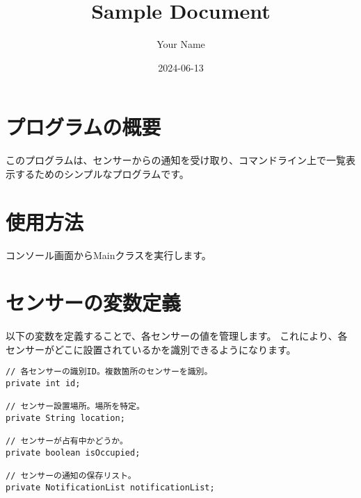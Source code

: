 \documentclass[11pt]{article}
\author{Your Name}
\date{2024-06-13}
\title{Sample Document}
\begin{document}
\maketitle

\section{プログラムの概要}
\label{sec:org3f72727}
このプログラムは、センサーからの通知を受け取り、コマンドライン上で一覧表示するためのシンプルなプログラムです。

\section{使用方法}
\label{sec:org97390fa}
コンソール画面からMainクラスを実行します。

\section{センサーの変数定義}
\label{sec:org344f41c}
以下の変数を定義することで、各センサーの値を管理します。
これにより、各センサーがどこに設置されているかを識別できるようになります。

\begin{lstlisting}
// 各センサーの識別ID。複数箇所のセンサーを識別。
private int id;

// センサー設置場所。場所を特定。
private String location;

// センサーが占有中かどうか。
private boolean isOccupied;

// センサーの通知の保存リスト。
private NotificationList notificationList;
\end{lstlisting}
\end{document}
